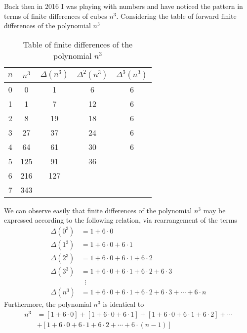 Back then in 2016 I was playing with numbers and have noticed the pattern in terms of finite differences
of cubes $n^3$.
Considering the table of forward finite differences of the polynomial $n^3$
\begin{table}[H]
    \begin{center}
        \setlength\extrarowheight{-6pt}
        \begin{tabular}{c|cccc}
            $n$ & $n^3$ & $\Delta(n^3)$ & $\Delta^2(n^3)$ & $\Delta^3(n^3)$ \\
            \hline
            0   & 0     & 1             & 6               & 6               \\
            1   & 1     & 7             & 12              & 6               \\
            2   & 8     & 19            & 18              & 6               \\
            3   & 27    & 37            & 24              & 6               \\
            4   & 64    & 61            & 30              & 6               \\
            5   & 125   & 91            & 36              &                 \\
            6   & 216   & 127           &                 &                 \\
            7   & 343   &               &                 &
        \end{tabular}
    \end{center}
    \caption{Table of finite differences of the polynomial $n^3$} \label{tab:table}
\end{table}
We can observe easily that finite differences of the polynomial $n^3$ may be expressed according
to the following relation, via rearrangement of the terms
\begin{align*}
    \Delta(0^3) &= 1+6 \cdot 0 \\
    \Delta(1^3) &= 1+6\cdot0+6\cdot1 \\
    \Delta(2^3) &= 1+6\cdot0+6\cdot1+6\cdot2 \\
    \Delta(3^3) &= 1+6\cdot0+6\cdot1+6\cdot2+6\cdot3 \\
    &\; \; \vdots \\
    \Delta(n^3) &= 1+6\cdot0+6\cdot1+6\cdot2+6\cdot3+\cdots+6\cdot n
\end{align*}
Furthermore, the polynomial $n^3$ is identical to
\begin{align*}
    n^3 &= [1+6\cdot0]+[1+6\cdot0+6\cdot1]+[1+6\cdot0+6\cdot1+6\cdot2]+\cdots \\
    &+[1+6\cdot0+6\cdot1+6\cdot2+\cdots+6\cdot(n-1)]
\end{align*}
